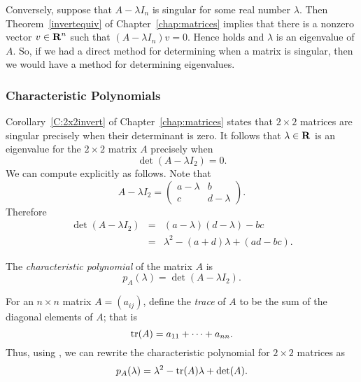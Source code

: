 Conversely, suppose that $A-\lambda I_n$ is singular for some
real number $\lambda$.  Then Theorem~\ref{invertequiv} of 
Chapter~\ref{chap:matrices} implies that there is a nonzero
vector $v\in\mbox{$\bf{R}$}^n$ such that $(A-\lambda I_n)v = 0$. Hence
 holds and $\lambda$ is an eigenvalue of $A$.
So, if we had a direct method for determining when a matrix
is singular, then we would have a method for determining
eigenvalues.

\subsubsection*{Characteristic Polynomials}

Corollary~\ref{C:2x2invert} of Chapter~\ref{chap:matrices}
states that $2\times 2$ matrices are singular precisely when
their determinant is zero.  It follows that $\lambda\in\mbox{$\bf{R}$}$ is
an eigenvalue for the $2\times 2$ matrix $A$ precisely when
\begin{equation} \label{deteqn}
\det(A-\lambda I_2) = 0.
\end{equation}
We can compute  explicitly as follows. Note that
\[
A-\lambda I_2 = \left(\begin{array}{cc} a-\lambda & b \\
c & d-\lambda \end{array} \right).
\]
Therefore
\begin{eqnarray}
\det(A-\lambda I_2) & = & (a-\lambda)(d-\lambda) - bc \nonumber \\
& = & \lambda^2 - (a+d)\lambda + (ad-bc). \label{e:charpoly}
\end{eqnarray}

\begin{Def} \label{charpolyn=2}
The {\em characteristic polynomial\/} of the matrix $A$ is
\[
p_A(\lambda) = \det(A-\lambda I_2).
\]
\end{Def} 

For an $n\times n$ matrix $A=(a_{ij})$, define the {\em trace\/}
 of $A$ to be the sum of the diagonal elements of $A$;
that is
\begin{equation}  \label{e:tracedef}
{\rm tr}(A) = a_{11} + \cdots + a_{nn}.
\end{equation}
Thus, using , we can rewrite the characteristic
polynomial for $2\times 2$ matrices as
\begin{equation} \label{e:invcharpoly}
p_A(\lambda)=\lambda^2 - {\rm tr}(A)\lambda + \det(A).
\end{equation}

